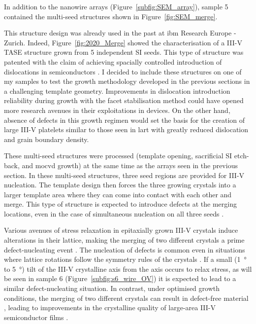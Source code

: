 In addition to the nanowire arrays (Figure~\ref{subfig:SEM_array}), sample 5 contained the multi-seed structures shown in Figure~\ref{fig:SEM_merge}. 

This structure design was already used in the past at \acs{ibm} Research Europe - Zurich. Indeed, Figure~\ref{fig:2020_Merge} showed the characterisation of a III-V \acs{TASE} structure grown from \num{5} independent \acl{SI} seeds. This type of structure was patented with the claim of achieving spacially controlled introduction of dislocations in semiconductors \cite{Mauthe2021}. I decided to include these structures on one of my samples to test the growth methodology developed in the previous sections in a challenging template geometry. Improvements in dislocation introduction reliability during growth with the facet stabilisation method could have opened more research avenues in their exploitations in devices. On the other hand, absence of defects in this growth regimen would set the basis for the creation of large III-V platelets similar to those seen in \acf{lart} \cite{Yan2021, Han2020} with greatly reduced dislocation and grain boundary density.

These multi-seed structures were processed (template opening, sacrificial \acl{SI} etch-back, and \acs{mocvd} growth) at the same time as the arrays seen in the previous section. In these multi-seed structures, three seed regions are provided for III-V nucleation. The template design then forces the three growing crystals into a larger template area where they can come into contact with each other and merge. This type of structure is expected to introduce defects at the merging locations, even in the case of simultaneous nucleation on all three seeds \cite{Mauthe2021}.

Various avenues of stress relaxation in epitaxially grown III-V crystals induce alterations in their lattice, making the merging of two different crystals a prime defect-nucleating event \cite{Jacobsson2015}. The nucleation of defects is common even in situations where lattice rotations follow the symmetry rules of the crystals \cite{Rossi2023}. If a small (\qty{1}{\degree} to \qty{5}{\degree}) tilt of the III-V crystalline axis from the  axis occurs to relax stress, as will be seen in sample 6 (Figure~\ref{subfig:s6_wire_OV}) it is expected to lead to a similar defect-nucleating situation. In contrast, under optimised growth conditions, the merging of two different crystals can result in defect-free material \cite{Imanishi2012}, leading to improvements in the crystalline quality of large-area III-V semiconductor films \cite{Imade2014}.

